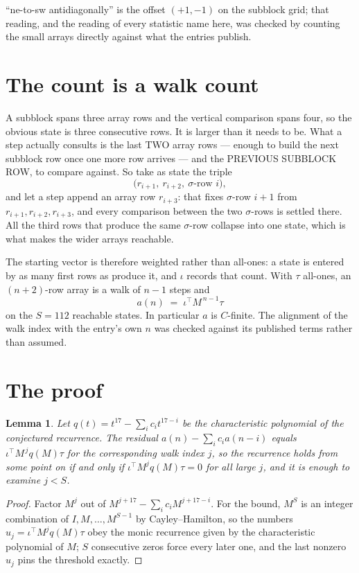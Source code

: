 \documentclass[11pt,a4paper]{article}
\theoremstyle{plain}
\newtheorem{lemma}[theorem]{Lemma}
\theoremstyle{definition}
\begin{document}
``ne-to-sw antidiagonally'' is the offset $(+1,-1)$ on the subblock grid; that reading, and
the reading of every statistic name here, was checked by counting the small arrays directly
against what the entries publish.

\section{The count is a walk count}

A subblock spans three array rows and the vertical comparison spans four, so the obvious state
is three consecutive rows. It is larger than it needs to be. What a step actually consults is
the last TWO array rows --- enough to build the next subblock row once one more row arrives ---
and the PREVIOUS SUBBLOCK ROW, to compare against. So take as state the triple
\[
\bigl(r_{i+1},\ r_{i+2},\ \sigma\text{-row }i\bigr),
\]
and let a step append an array row $r_{i+3}$: that fixes $\sigma$-row $i+1$ from
$r_{i+1},r_{i+2},r_{i+3}$, and every comparison between the two $\sigma$-rows is settled
there. All the third rows that produce the same $\sigma$-row collapse into one state, which is
what makes the wider arrays reachable.

The starting vector is therefore weighted rather than all-ones: a state is entered by as many
first rows as produce it, and $\iota$ records that count. With $\tau$ all-ones, an
$(n+2)$-row array is a walk of $n-1$ steps and
\[
a(n)\;=\;\iota^{\!\top}M^{\,n-1}\tau
\]
on the $S=112$ reachable states. In particular $a$ is $C$-finite. The alignment of the walk
index with the entry's own $n$ was checked against its published terms rather than assumed.

\section{The proof}

\begin{lemma}\label{lem:crit}
Let $q(t)=t^{17}-\sum_i c_it^{17-i}$ be the characteristic polynomial of the
conjectured recurrence. The residual $a(n)-\sum_ic_ia(n-i)$ equals
$\iota^{\!\top}M^{\,j}q(M)\tau$ for the corresponding walk index $j$, so the recurrence
holds from some point on if and only if $\iota^{\!\top}M^{j}q(M)\tau=0$ for all large $j$,
and it is enough to examine $j<S$.
\end{lemma}

\begin{proof}
Factor $M^{j}$ out of $M^{j+17}-\sum_ic_iM^{j+17-i}$. For the bound, $M^{S}$
is an integer combination of $I,M,\dots,M^{S-1}$ by Cayley--Hamilton, so the numbers
$u_j=\iota^{\!\top}M^{j}q(M)\tau$ obey the monic recurrence given by the characteristic
polynomial of $M$; $S$ consecutive zeros force every later one, and the last nonzero $u_j$
pins the threshold exactly.
\end{proof}
\end{document}
